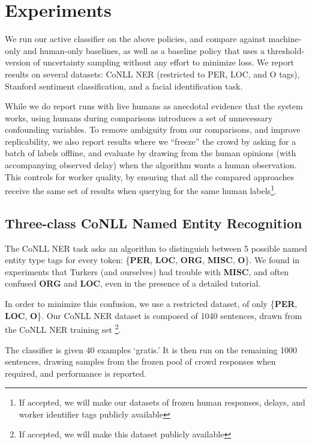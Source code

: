 \section{Experiments}
\label{sec:experiments}

We run our active classifier on the above policies, and compare against machine-only and human-only baselines, as well as a baseline policy that uses a threshold-version of uncertainty sampling without any effort to minimize loss.
We report results on several datasets: CoNLL NER (restricted to PER, LOC, and O tags), Stanford sentiment classification, and a facial identification task.

While we do report runs with live humans as anecdotal evidence that the system works, using humans during comparisons introduces a set of unnecessary confounding variables. To remove ambiguity from our comparisons, and improve replicability, we also report results where we ``freeze'' the crowd by asking for a batch of labels offline, and evaluate by drawing from the human opinions (with accompanying observed delay) when the algorithm wants a human observation.
This controls for worker quality, by ensuring that all the compared approaches receive the same set of results when querying for the same human labels\footnote{If accepted, we will make our datasets of frozen human responses, delays, and worker identifier tags publicly available}.

\subsection{Three-class CoNLL Named Entity Recognition}

The CoNLL NER task asks an algorithm to distinguish between 5 possible named entity type tags for every token: \{\textbf{PER}, \textbf{LOC}, \textbf{ORG}, \textbf{MISC}, \textbf{O}\}.
We found in experiments that Turkers (and ourselves) had trouble with \textbf{MISC}, and often confused \textbf{ORG} and \textbf{LOC}, even in the presence of a detailed tutorial.

In order to minimize this confusion, we use a restricted dataset, of only \{\textbf{PER}, \textbf{LOC}, \textbf{O}\}.
Our CoNLL NER dataset is composed of 1040 sentences, drawn from the CoNLL NER training set \footnote{If accepted, we will make this dataset publicly available}.

The classifier is given 40 examples `gratis.' It is then run on the remaining 1000 sentences, drawing samples from the frozen pool of crowd responses when required, and performance is reported.

